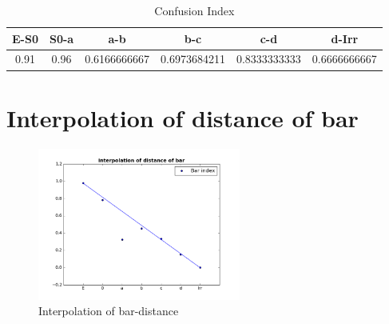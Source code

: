 \documentclass[a4paper,11pt]{article}
\begin{document}
\begin{table}[h]
\centering
\begin{tabular}{|c|c|c|c|c|c|}
\hline
E-S0 &	S0-a & a-b & b-c & c-d	& d-Irr\\
\hline
0.91 & 0.96 & 0.6166666667  & 0.6973684211	& 0.8333333333	& 0.6666666667\\
\hline
\end{tabular}
\caption{\label{tab:iv} Confusion Index }
\end{table}

\section{Interpolation of distance of bar}
\label{sec:interp}

\begin{figure}[h!]
\centering
\includegraphics[height=50mm, width=90 mm]{interpolation.png}
\caption{\label{fig:iv} Interpolation of bar-distance}
\end{figure}
\end{document}
